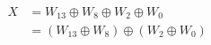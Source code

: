 \documentclass[border=2pt]{standalone}
\begin{document}
\Large
\(\begin{aligned}
X &= W_{13} \oplus W_8 \oplus W_2 \oplus W_0 \\
  &= (W_{13} \oplus W_8) \oplus (W_2 \oplus W_0)
\end{aligned}\)
\end{document}
